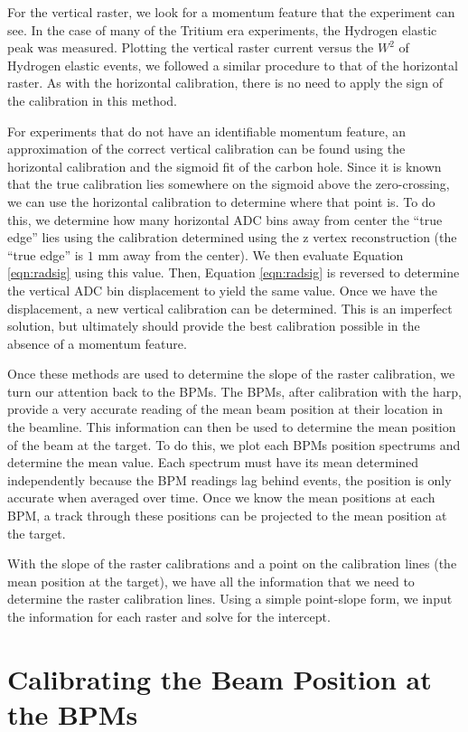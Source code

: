 For the vertical raster, we look for a momentum feature that the experiment can see. In the case of many of the Tritium era experiments, the Hydrogen elastic peak was measured. Plotting the vertical raster current versus the $W^2$ of Hydrogen elastic events, we followed a similar procedure to that of the horizontal raster. As with the horizontal calibration, there is no need to apply the sign of the calibration in this method.

For experiments that do not have an identifiable momentum feature, an approximation of the correct vertical calibration can be found using the horizontal calibration and the sigmoid fit of the carbon hole. Since it is known that the true calibration lies somewhere on the sigmoid above the zero-crossing, we can use the horizontal calibration to determine where that point is. To do this, we determine how many horizontal ADC bins away from center the ``true edge'' lies using the calibration determined using the z vertex reconstruction (the ``true edge'' is $1$ mm away from the center). We then evaluate Equation \ref{eqn:radsig} using this value. Then, Equation \ref{eqn:radsig} is reversed to determine the vertical ADC bin displacement to yield the same value. Once we have the displacement, a new vertical calibration can be determined. This is an imperfect solution, but ultimately should provide the best calibration possible in the absence of a momentum feature.

Once these methods are used to determine the slope of the raster calibration, we turn our attention back to the BPMs. The BPMs, after calibration with the harp, provide a very accurate reading of the mean beam position at their location in the beamline. This information can then be used to determine the mean position of the beam at the target. To do this, we plot each BPMs position spectrums and determine the mean value. Each spectrum must have its mean determined independently because the BPM readings lag behind events, the position is only accurate when averaged over time. Once we know the mean positions at each BPM, a track through these positions can be projected to the mean position at the target.

With the slope of the raster calibrations and a point on the calibration lines (the mean position at the target), we have all the information that we need to determine the raster calibration lines. Using a simple point-slope form, we input the information for each raster and solve for the intercept.

\section{Calibrating the Beam Position at the BPMs}

